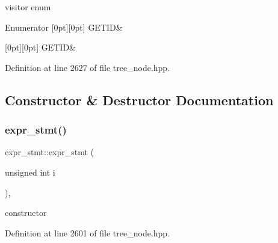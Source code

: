 visitor enum 

\begin{DoxyEnumFields}{Enumerator}
[0pt][0pt]{}\mbox{\label{structexpr__stmt_a2cf275af9f5cbba5db5011aaf2a0a9d0a8050d5af094395c15a91cd3b056467de}} 
G\+E\+T\+ID&\\
\hline

[0pt][0pt]{}\mbox{\label{structexpr__stmt_a2cf275af9f5cbba5db5011aaf2a0a9d0a8050d5af094395c15a91cd3b056467de}} 
G\+E\+T\+ID&\\
\hline

\end{DoxyEnumFields}


Definition at line 2627 of file tree\+\_\+node.\+hpp.



\subsection{Constructor \& Destructor Documentation}
\mbox{\label{structexpr__stmt_ab2c288af7109486112aa93aab83f4e90}} 
\subsubsection{\texorpdfstring{expr\+\_\+stmt()}{expr\_stmt()}}
{\footnotesize\ttfamily expr\+\_\+stmt\+::expr\+\_\+stmt (\begin{DoxyParamCaption}\item[{unsigned int}]{i }\end{DoxyParamCaption})\hspace{0.3cm}{\ttfamily [inline]}, {\ttfamily [explicit]}}



constructor 



Definition at line 2601 of file tree\+\_\+node.\+hpp.



